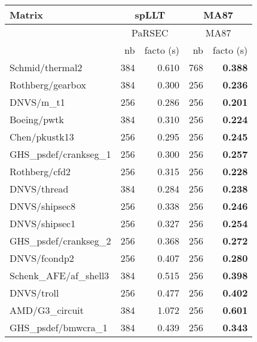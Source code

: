 \begin{tabular}{l|rr|rr}
  \hline
  Matrix                          & \multicolumn{2}{c}{spLLT}  & \multicolumn{2}{c}{MA87}     \\
  \hline
                                  & \multicolumn{2}{c}{PaRSEC} & \multicolumn{2}{c}{MA87}     \\ 
  \cline{2-5}
                                  & nb                         & facto (s) & nb  & facto (s)  \\
  \hline
  Schmid/thermal2                 & 384                        & 0.610     & 768 & \bf 0.388  \\
  Rothberg/gearbox                & 384                        & 0.300     & 256 & \bf 0.236  \\
  DNVS/m\_t1                      & 256                        & 0.286     & 256 & \bf 0.201  \\
  Boeing/pwtk                     & 384                        & 0.310     & 256 & \bf 0.224  \\
  Chen/pkustk13                   & 256                        & 0.295     & 256 & \bf 0.245  \\
  GHS\_psdef/crankseg\_1          & 256                        & 0.300     & 256 & \bf 0.257  \\
  Rothberg/cfd2                   & 256                        & 0.315     & 256 & \bf 0.228  \\
  DNVS/thread                     & 384                        & 0.284     & 256 & \bf 0.238  \\
  DNVS/shipsec8                   & 256                        & 0.338     & 256 & \bf 0.246  \\
  DNVS/shipsec1                   & 256                        & 0.327     & 256 & \bf 0.254  \\
  GHS\_psdef/crankseg\_2          & 256                        & 0.368     & 256 & \bf 0.272  \\
  DNVS/fcondp2                    & 256                        & 0.407     & 256 & \bf 0.280  \\
  Schenk\_AFE/af\_shell3          & 384                        & 0.515     & 256 & \bf 0.398  \\
  DNVS/troll                      & 256                        & 0.477     & 256 & \bf 0.402  \\
  AMD/G3\_circuit                 & 384                        & 1.072     & 256 & \bf 0.601  \\
  GHS\_psdef/bmwcra\_1            & 384                        & 0.439     & 256 & \bf 0.343  \\

\end{tabular}
